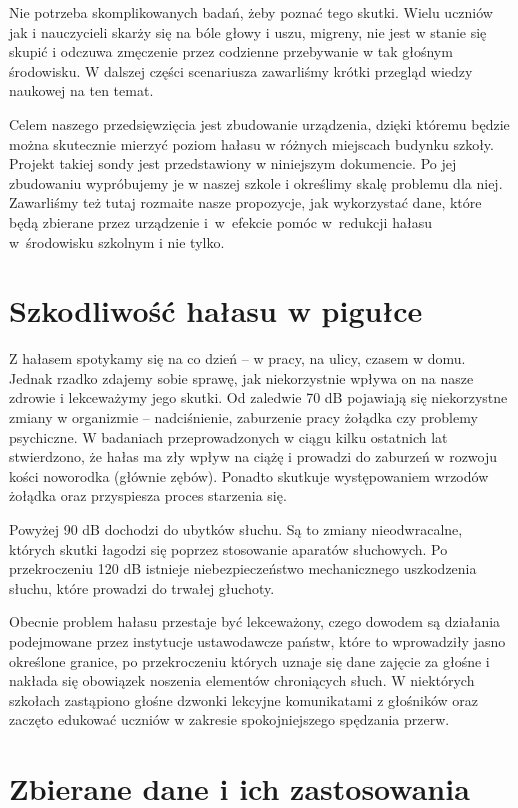 \documentclass[12pt, a4paper]{article}
\begin{document}
Nie potrzeba skomplikowanych badań, żeby poznać tego skutki. Wielu uczniów jak i nauczycieli skarży się na bóle głowy i uszu, migreny, nie jest w stanie się skupić i odczuwa zmęczenie przez codzienne przebywanie w tak głośnym środowisku. W dalszej części scenariusza zawarliśmy krótki przegląd wiedzy naukowej na ten temat.

Celem naszego przedsięwzięcia jest zbudowanie urządzenia, dzięki któremu będzie można skutecznie mierzyć poziom hałasu w różnych miejscach budynku szkoły. Projekt takiej sondy jest przedstawiony w niniejszym dokumencie. Po jej zbudowaniu wypróbujemy je w naszej szkole i określimy skalę problemu dla niej. Zawarliśmy też tutaj rozmaite nasze propozycje, jak wykorzystać dane, które będą zbierane przez urządzenie i~w~efekcie pomóc w~redukcji hałasu w~środowisku szkolnym i nie tylko.

\section{Szkodliwość hałasu w pigułce}
Z hałasem spotykamy się na co dzień -- w pracy, na ulicy, czasem w domu. Jednak rzadko zdajemy sobie sprawę, jak niekorzystnie wpływa on na nasze zdrowie i lekceważymy jego skutki. Od zaledwie 70 dB pojawiają się niekorzystne zmiany w organizmie -- nadciśnienie, zaburzenie pracy żołądka czy problemy psychiczne\cite{70db}. W badaniach przeprowadzonych w ciągu kilku ostatnich lat stwierdzono, że hałas ma zły wpływ na ciążę i prowadzi do zaburzeń w rozwoju kości noworodka (głównie zębów). Ponadto skutkuje występowaniem wrzodów żołądka oraz przyspiesza proces starzenia się.

Powyżej 90 dB dochodzi do ubytków słuchu. Są to zmiany nieodwracalne, których skutki łagodzi się poprzez stosowanie aparatów słuchowych. Po przekroczeniu 120 dB istnieje niebezpieczeństwo mechanicznego uszkodzenia słuchu, które prowadzi do trwałej głuchoty.

Obecnie problem hałasu przestaje być lekceważony, czego dowodem są działania podejmowane przez instytucje ustawodawcze państw, które to wprowadziły jasno określone granice, po przekroczeniu których uznaje się dane zajęcie za głośne i nakłada się obowiązek noszenia elementów chroniących słuch. W niektórych szkołach zastąpiono głośne dzwonki lekcyjne komunikatami z głośników oraz zaczęto edukować uczniów w zakresie spokojniejszego spędzania przerw.

\section{Zbierane dane i ich zastosowania}
\end{document}
